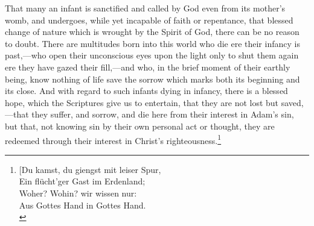 \documentclass[english,]{book}
\begin{document}
That many an infant is sanctified and called by God even from its mother's womb, and undergoes, while yet incapable of faith or repentance, that blessed change of nature which is wrought by the Spirit of God, there can be no reason to doubt. There are multitudes born into this world who die ere their infancy is past,---who open their unconscious eyes upon the light only to shut them again ere they have gazed their fill,---and who, in the brief moment of their earthly being, know nothing of life save the sorrow which marks both its beginning and its close. And with regard to such infants dying in infancy, there is a blessed hope, which the Scriptures give us to entertain, that they are not lost but saved,---that they suffer, and sorrow, and die here from their interest in Adam's sin, but that, not knowing sin by their own personal act or thought, they are redeemed through their interest in Christ's righteousness.\footnote{{[}Du kamst, du giengst mit leiser Spur,\\
  Ein flücht'ger Gast im Erdenland;\\
  Woher? Wohin? wir wissen nur:\\
  Aus Gottes Hand in Gottes Hand.\\
}
\end{document}
